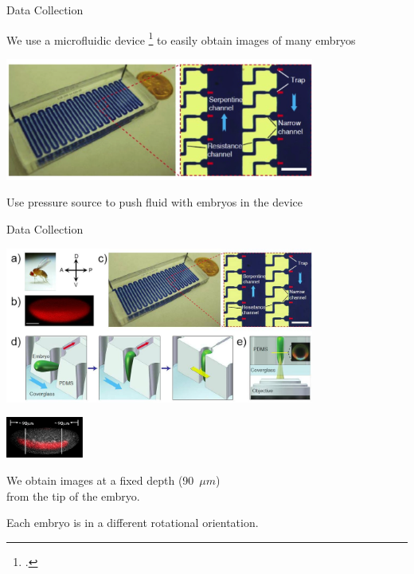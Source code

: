 \documentclass[10pt]{beamer}
\begin{document}
\begin{frame}{Data Collection}

\begin{center}
We use a microfluidic device \footcite{chung2010microfluidic} to easily obtain images of many embryos

\includegraphics[width=4in]{drosophila_imaging_setup_close}

Use pressure source to push fluid with embryos in the device

\end{center}

\end{frame}

\begin{frame}{Data Collection}

\begin{center}
\includegraphics[width=4in]{drosophila_imaging_setup}

\vspace{0.2in}

\begin{minipage}[b]{1.1in}
\includegraphics[width=1in]{imaging_depth}
\end{minipage}
%
\begin{minipage}[b]{0.65\textwidth}
We obtain images at a fixed depth (90~$\mu m$) \\from the tip of the embryo.

Each embryo is in a different rotational orientation.
\end{minipage}

\end{center}

\end{frame}
\end{document}

